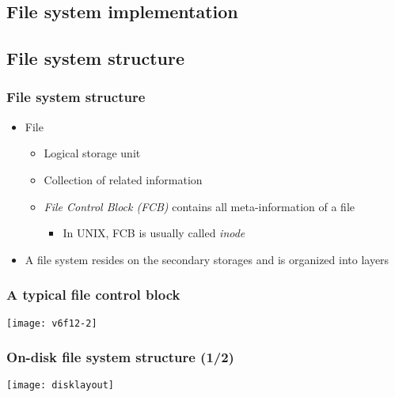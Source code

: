 \documentclass[CJKutf8,xcolor=pdftex,dvipsnames,table]{beamer}
\begin{document}
\begin{CJK*}{UTF8}{song}
  \section{File system implementation}

  \subsection{File system structure}

  \begin{frame}
    \frametitle{File system structure} \pause
    \begin{itemize}\parskip=0pt
    \item File \pause
      \begin{itemize}\parskip=0pt
      \item Logical storage unit \pause
      \item Collection of related information \pause
      \item \emph{File Control Block (FCB)} contains all meta-information of a file \pause
        \begin{itemize}\parskip=0pt
        \item In UNIX, FCB is usually called \emph{inode} \pause
        \end{itemize}
      \end{itemize}
    \item A file system resides on the secondary storages and is organized into layers
    \end{itemize}
  \end{frame}

\iffalse
  \begin{frame}
    \frametitle{Layered File system} \pause
    \begin{center}
      \texttt{[image: v6f12-1]}
    \end{center}
  \end{frame}
\fi
  
  \begin{frame}
    \frametitle{A typical file control block} \pause
    \begin{center}
      \texttt{[image: v6f12-2]}
    \end{center}
  \end{frame}
  
  \begin{frame}
    \frametitle{On-disk file system structure (1/2)} \pause
    \begin{center}
      \texttt{[image: disklayout]}
    \end{center}
  \end{frame}
  

\end{CJK*}
\end{document}
